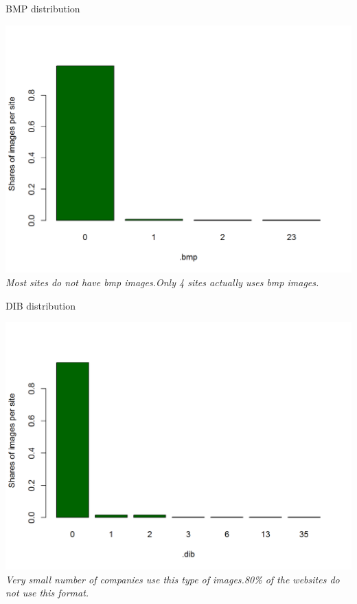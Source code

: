 \documentclass{book}
\begin{document}
\begin{table}[H]
\centering
\caption{BMP distribution}
\begin{center}
\includegraphics[scale=0.4]{../R/photos/54_bmp_dist.png}    \\
\textit{Most sites do not have bmp images.Only 4 sites actually uses bmp images.}
\end{center}
\end{table}
\begin{table}[H]
\centering
\caption{DIB distribution}
\begin{center}
\includegraphics[scale=0.4]{../R/photos/55_dib_dist.png}    \\
\textit{Very small number of companies use this type of images.80\% of the websites do not use this format.}
\end{center}
\end{table}
\end{document}
